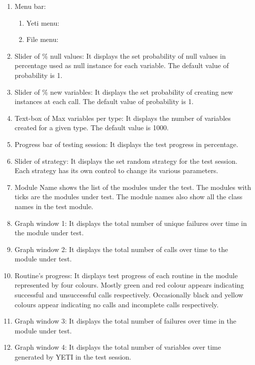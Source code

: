 \begin{enumerate}

\item Menu bar:
\begin{enumerate}
\item Yeti menu:
\item File menu:
\end{enumerate}
\item Slider of \% null values: It displays the set probability of null values in percentage used as null instance for each variable. The default value of probability is 1. 
\item Slider of \% new variables: It displays the set probability of creating new instances at each call. The default value of probability is 1. 
\item Text-box of Max variables per type: It displays the number of variables created for a given type. The default value is 1000.
\item Progress bar of testing session: It displays the test progress in percentage.
\item Slider of strategy: It displays the set random strategy for the test session. Each strategy has its own control to change its various parameters. 
\item Module Name shows the list of the modules under the test. The
modules with ticks are the modules under test. The module names also show all the
class names in the test module.
\item Graph window 1: It displays the total number of unique failures over time in the module under test.
\item Graph window 2: It displays the total number of calls over time to the module under test.
\item Routine's progress: It displays test progress of each routine in the module represented by four colours. Mostly green and red colour appears indicating successful and unsuccessful calls respectively. Occasionally black and yellow colours appear indicating no calls and incomplete calls respectively.
\item Graph window 3: It displays the total number of failures over time in the module under test. 
\item Graph window 4: It displays the total number of variables over time generated by YETI in the test session.

\end{enumerate}
